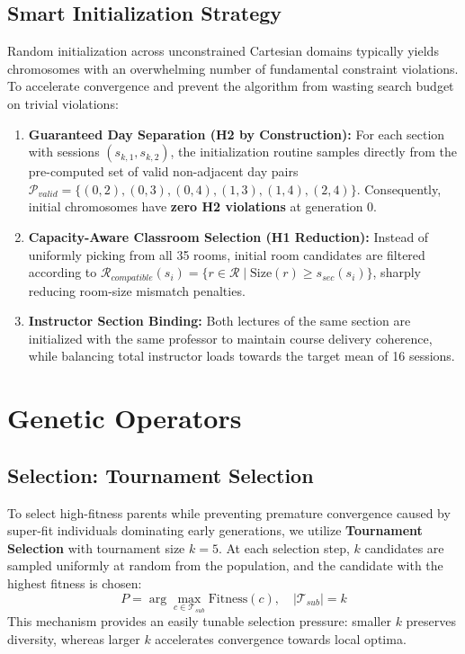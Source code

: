 \documentclass[12pt,a4paper]{report}
\begin{document}
\section{Smart Initialization Strategy}
Random initialization across unconstrained Cartesian domains typically yields chromosomes with an overwhelming number of fundamental constraint violations. To accelerate convergence and prevent the algorithm from wasting search budget on trivial violations:
\begin{enumerate}[leftmargin=1.5em]
  \item \textbf{Guaranteed Day Separation (H2 by Construction):}
  For each section with sessions $(s_{k, 1}, s_{k, 2})$, the initialization routine samples directly from the pre-computed set of valid non-adjacent day pairs $\mathcal{P}_{valid} = \{(0, 2), (0, 3), (0, 4), (1, 3), (1, 4), (2, 4)\}$. Consequently, initial chromosomes have \textbf{zero H2 violations} at generation 0.
  \item \textbf{Capacity-Aware Classroom Selection (H1 Reduction):}
  Instead of uniformly picking from all 35 rooms, initial room candidates are filtered according to $\mathcal{R}_{compatible}(s_i) = \{r \in \mathcal{R} \mid \text{Size}(r) \ge s_{sec}(s_i)\}$, sharply reducing room-size mismatch penalties.
  \item \textbf{Instructor Section Binding:}
  Both lectures of the same section are initialized with the same professor to maintain course delivery coherence, while balancing total instructor loads towards the target mean of 16 sessions.
\end{enumerate}

\chapter{Genetic Operators}

\section{Selection: Tournament Selection}
To select high-fitness parents while preventing premature convergence caused by super-fit individuals dominating early generations, we utilize \textbf{Tournament Selection} with tournament size $k = 5$.
At each selection step, $k$ candidates are sampled uniformly at random from the population, and the candidate with the highest fitness is chosen:
\begin{equation}
  P = \arg\max_{c \in \mathcal{T}_{sub}} \text{Fitness}(c), \quad |\mathcal{T}_{sub}| = k
\end{equation}
This mechanism provides an easily tunable selection pressure: smaller $k$ preserves diversity, whereas larger $k$ accelerates convergence towards local optima.
\end{document}

